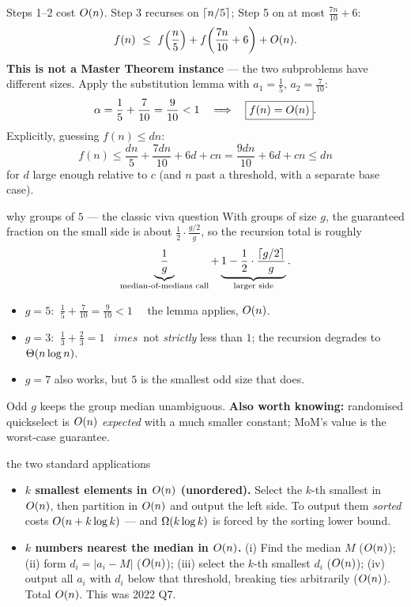 \begin{cplx}
Steps 1--2 cost $O(n)$. Step 3 recurses on $\left\lceil n/5 \right\rceil$; Step 5 on at most $\tfrac{7n}{10}+6$:
\[
  f(n)\ \le\ f\!\left(\frac n5\right)+f\!\left(\frac{7n}{10}+6\right)+O(n) .
\]
\textbf{This is not a Master Theorem instance} --- the two subproblems have different sizes.
Apply the substitution lemma with $a_1=\tfrac15$, $a_2=\tfrac7{10}$:
\[
  \alpha=\frac15+\frac{7}{10}=\frac{9}{10}<1
  \quad\Longrightarrow\quad \boxed{f(n)=O(n)}.
\]
Explicitly, guessing $f(n)\le dn$:
\[
  f(n)\le \frac{dn}{5}+\frac{7dn}{10}+6d+cn=\frac{9dn}{10}+6d+cn\le dn
\]
for $d$ large enough relative to $c$ (and $n$ past a threshold, with a separate base case).
\end{cplx}

\begin{facts}{why groups of $5$ --- the classic viva question}
With groups of size $g$, the guaranteed fraction on the small side is about
$\tfrac12\cdot\tfrac{g/2}{g}$, so the recursion total is roughly
\[
  \underbrace{\frac1g}_{\text{median-of-medians call}}+\underbrace{1-\frac12\cdot\frac{\left\lceil g/2 \right\rceil}{g}}_{\text{larger side}} .
\]
\begin{itemize}
  \item $g=5$: $\ \tfrac15+\tfrac7{10}=\tfrac9{10}<1$ \ \checkmark\ the lemma applies, $O(n)$.
  \item $g=3$: $\ \tfrac13+\tfrac23=1$ \ $	imes$\ not \emph{strictly} less than $1$; the
        recursion degrades to $\Theta(n\log n)$.
  \item $g=7$ also works, but $5$ is the smallest odd size that does.
\end{itemize}
Odd $g$ keeps the group median unambiguous. \textbf{Also worth knowing:} randomised quickselect
is $O(n)$ \emph{expected} with a much smaller constant; MoM's value is the worst-case guarantee.
\end{facts}

\begin{facts}{the two standard applications}
\begin{itemize}
  \item \textbf{$k$ smallest elements in $O(n)$ (unordered).} Select the $k$-th smallest in
        $O(n)$, then partition in $O(n)$ and output the left side. To output them
        \emph{sorted} costs $O(n+k\log k)$ --- and $\Omega(k\log k)$ is forced by the sorting
        lower bound.
  \item \textbf{$k$ numbers nearest the median in $O(n)$.} (i) Find the median $M$ ($O(n)$);
        (ii) form $d_i=|a_i-M|$ ($O(n)$); (iii) select the $k$-th smallest $d_i$ ($O(n)$);
        (iv) output all $a_i$ with $d_i$ below that threshold, breaking ties arbitrarily
        ($O(n)$). Total $O(n)$. This was 2022 Q7.
\end{itemize}
\end{facts}


